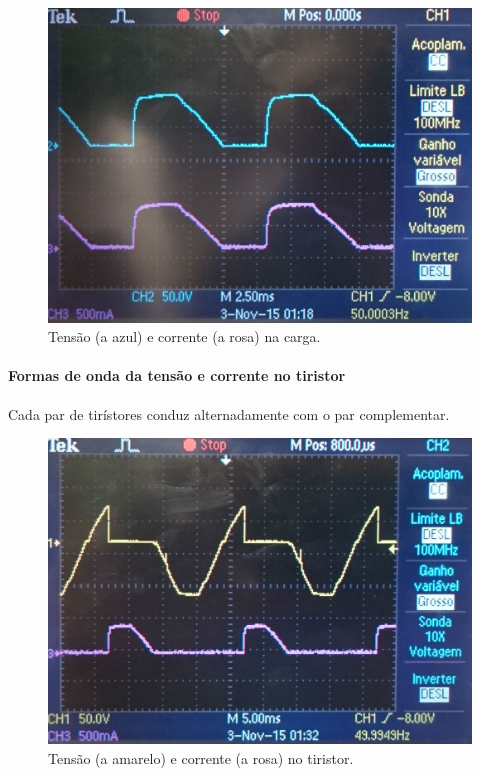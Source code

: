 \documentclass[a4paper,11pt]{article}
\numberwithin{equation}{section}
\begin{document}
\begin{figure}[H]
	\centering
	\includegraphics[keepaspectratio=true, scale=0.13]{img/DSC_0182}
	\caption{Tensão (a azul) e corrente (a rosa) na carga.}
	\label{fig:tccarga}
	\vspace{-0.8em}
\end{figure}

\paragraph{Formas de onda da tensão e corrente no tiristor}

Cada par de tirístores conduz alternadamente com o par complementar.

\begin{figure}[H]
	\centering
	\includegraphics[keepaspectratio=true, scale=0.13]{img/DSC_0183}
	\caption{Tensão (a amarelo) e corrente (a rosa) no tiristor.}
	\label{fig:tctiristor}
	\vspace{-0.8em}
\end{figure}
\end{document}
